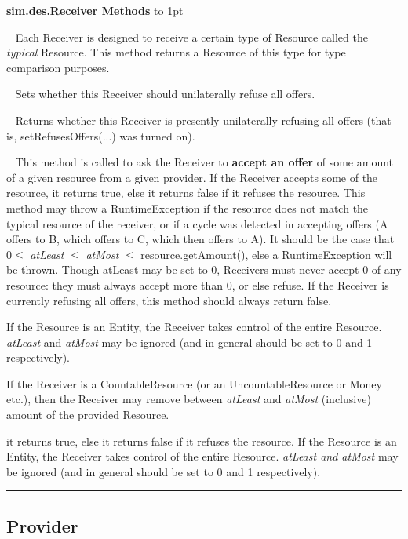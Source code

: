 \documentclass[twoside,10pt]{article}
\newcommand\class[1]{\index{Classes!{#1}}\textsf{#1}}
\newcommand*{\xfill}[1][0pt]{%
	\cleaders
		\hbox to 1pt{\hss
			\raisebox{#1}{\rule{1.2pt}{0.4pt}}%
			\hss}\hfill}
\newenvironment{methods}[1]{
\vspace{1.0em}\noindent\textsf{\textbf{#1 Methods}}\quad \xfill[0.5ex]
\vspace{-0.25em}
\begin{description}
\small}
{\end{description}\hrule\vspace{1.5em}}
\newcommand{\mthd}[1]{\item[{\sf #1}]~\newline}
\begin{document}
\begin{methods}{\class{sim.des.Receiver}}


\mthd{public Resource getTypicalReceived()}
Each Receiver is designed to receive a certain type of Resource called the {\it typical} Resource.  This method returns a Resource of this type for type comparison purposes.

\mthd{public void setRefusesOffers(boolean value)}
Sets whether this Receiver should unilaterally refuse all offers.

\mthd{public boolean getRefusesOffers()}
Returns whether this Receiver is presently unilaterally refusing all offers (that is, setRefusesOffers(...) was turned on).

\mthd{public boolean accept(Provider provider, Resource resource, double atLeast, double atMost)}
This method is called to ask the Receiver to {\bf accept an offer} of some amount of a given resource from a given provider.   If the Receiver accepts some of the resource, it returns true, else it returns false if it refuses the resource.   This method may throw a RuntimeException if the resource does not match the typical resource of the receiver, or if a cycle was detected in accepting offers (A offers to B, which offers to C, which then offers to A).  It should be the case that \(0 \leq\) {\it atLeast} \(\leq\) {\it atMost} \(\leq\) resource.getAmount(), else a RuntimeException will be thrown.  Though atLeast may be set to 0, Receivers must never accept 0 of any resource: they must always accept more than 0, or else refuse.  If the Receiver is currently refusing all offers, this method should always return false.

If the Resource is an Entity, the Receiver takes control of the entire Resource.  {\it atLeast} and {\it atMost} may be ignored (and in general should be set to 0 and 1 respectively).

If the Receiver is a CountableResource (or an UncountableResource or Money etc.), then the Receiver may remove between {\it atLeast} and {\it atMost} (inclusive) amount of the provided Resource.

it returns true, else it returns false if it refuses the resource.   If the Resource is an Entity, the Receiver takes control of the entire Resource.  {\it atLeast and atMost} may be ignored (and in general should be set to 0 and 1 respectively).

\end{methods}

\subsection{Provider}
\end{document}
